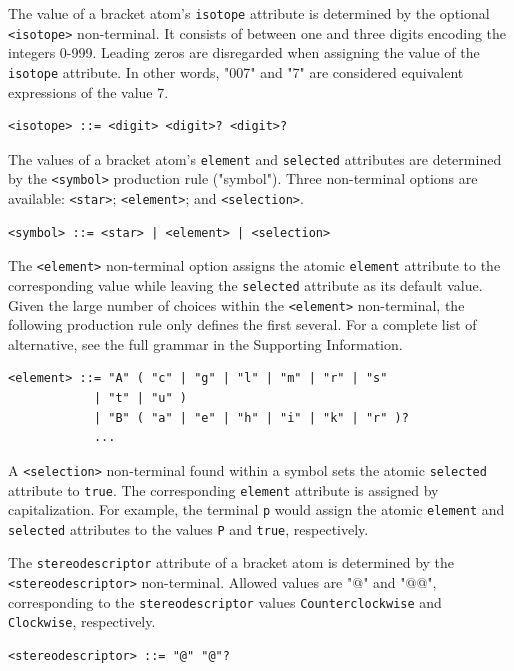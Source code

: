 \documentclass{article}
\def\ttt{\texttt}
\begin{document}
The value of a bracket atom's \ttt{isotope} attribute is determined by the optional \ttt{<isotope>} non-terminal. It consists of between one and three digits encoding the integers 0-999. Leading zeros are disregarded when assigning the value of the \ttt{isotope} attribute. In other words, "007" and "7" are considered equivalent expressions of the value 7.

\begin{lstlisting}
<isotope> ::= <digit> <digit>? <digit>?
\end{lstlisting}

The values of a bracket atom's \ttt{element} and \ttt{selected} attributes are determined by the \ttt{<symbol>} production rule ("symbol"). Three non-terminal options are available: \ttt{<star>}; \ttt{<element>}; and \ttt{<selection>}.

\begin{lstlisting}
<symbol> ::= <star> | <element> | <selection>
\end{lstlisting}

The \ttt{<element>} non-terminal option assigns the atomic \ttt{element} attribute to the corresponding value while leaving the \ttt{selected} attribute as its default value. Given the large number of choices within the \ttt{<element>} non-terminal, the following production rule only defines the first several. For a complete list of alternative, see the full grammar in the Supporting Information.

\begin{lstlisting}
<element> ::= "A" ( "c" | "g" | "l" | "m" | "r" | "s"
            | "t" | "u" )
            | "B" ( "a" | "e" | "h" | "i" | "k" | "r" )?
            ...
\end{lstlisting}

A \ttt{<selection>} non-terminal found within a symbol sets the atomic \ttt{selected} attribute to \ttt{true}. The corresponding \ttt{element} attribute is assigned by capitalization. For example, the terminal \ttt{p} would assign the atomic \ttt{element} and \ttt{selected} attributes to the values \ttt{P} and \ttt{true}, respectively.

The \ttt{stereodescriptor} attribute of a bracket atom is determined by the \ttt{<stereodescriptor>} non-terminal. Allowed values are "@" and "@@", corresponding to the \ttt{stereodescriptor} values \ttt{Counterclockwise} and \ttt{Clockwise}, respectively.

\begin{lstlisting}
<stereodescriptor> ::= "@" "@"?
\end{lstlisting}
\end{document}
